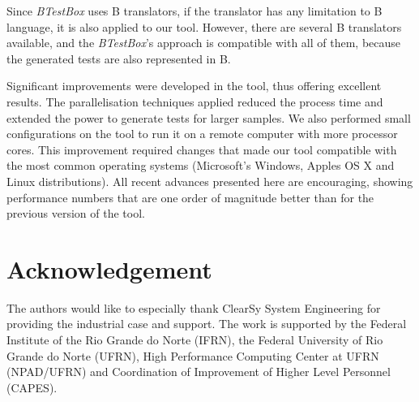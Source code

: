 \documentclass[runningheads]{llncs}
\begin{document}


Since  \textit{BTestBox} uses B translators, if the translator has any limitation to B language, it is also applied to our tool. However, there are several B translators available, and the  \textit{BTestBox}'s approach is compatible with all of them, because the generated tests are also represented in B. 


Significant improvements were developed in the tool, thus offering excellent results.
The parallelisation techniques applied reduced the process time and extended the power to generate tests for larger samples. We also performed small configurations on the tool to run it on a remote computer with more processor cores. This improvement required changes that made our tool compatible with the most common operating systems (Microsoft’s Windows, Apple\textquotesingle s OS X and Linux distributions). All recent advances presented here are encouraging, showing performance numbers that are one order of magnitude better than for the previous version of the tool.


\section*{Acknowledgement}
  The authors would like to especially thank ClearSy System Engineering for providing the industrial case and support. %
  The work is supported by the Federal Institute of the Rio Grande do Norte (IFRN), the Federal University of Rio Grande do Norte (UFRN), High Performance Computing Center at UFRN (NPAD/UFRN) and Coordination of Improvement of Higher Level Personnel (CAPES).



%
%
%




 
\end{document}
